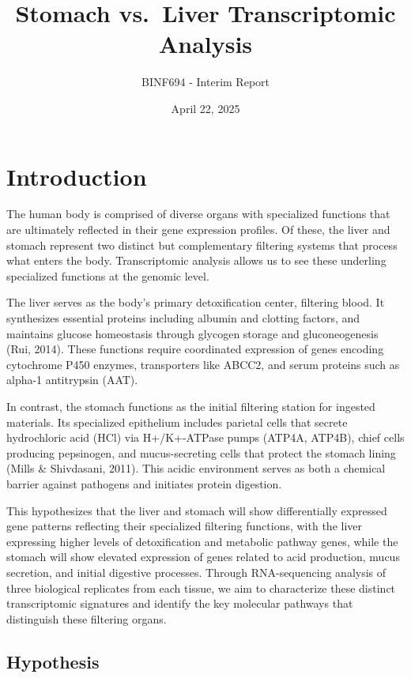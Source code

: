 \documentclass[
]{article}
\title{Stomach vs.~Liver Transcriptomic Analysis}
\subtitle{BINF694 - Interim Report}
\author{}
\date{\vspace{-2.5em}April 22, 2025}
\begin{document}
\maketitle

\section{Introduction}\label{introduction}

The human body is comprised of diverse organs with specialized functions
that are ultimately reflected in their gene expression profiles. Of
these, the liver and stomach represent two distinct but complementary
filtering systems that process what enters the body. Transcriptomic
analysis allows us to see these underling specialized functions at the
genomic level.

The liver serves as the body's primary detoxification center, filtering
blood. It synthesizes essential proteins including albumin and clotting
factors, and maintains glucose homeostasis through glycogen storage and
gluconeogenesis (Rui, 2014). These functions require coordinated
expression of genes encoding cytochrome P450 enzymes, transporters like
ABCC2, and serum proteins such as alpha-1 antitrypsin (AAT).

In contrast, the stomach functions as the initial filtering station for
ingested materials. Its specialized epithelium includes parietal cells
that secrete hydrochloric acid (HCl) via H+/K+-ATPase pumps (ATP4A,
ATP4B), chief cells producing pepsinogen, and mucus-secreting cells that
protect the stomach lining (Mills \& Shivdasani, 2011). This acidic
environment serves as both a chemical barrier against pathogens and
initiates protein digestion.

This hypothesizes that the liver and stomach will show differentially
expressed gene patterns reflecting their specialized filtering
functions, with the liver expressing higher levels of detoxification and
metabolic pathway genes, while the stomach will show elevated expression
of genes related to acid production, mucus secretion, and initial
digestive processes. Through RNA-sequencing analysis of three biological
replicates from each tissue, we aim to characterize these distinct
transcriptomic signatures and identify the key molecular pathways that
distinguish these filtering organs.

\subsection{Hypothesis}\label{hypothesis}
\end{document}
